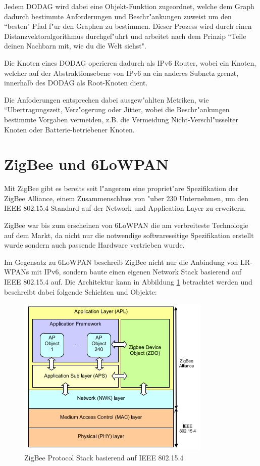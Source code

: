 \documentclass[final]{lktseminar}
\begin{document}
Jedem DODAG wird dabei eine Objekt-Funktion zugeordnet, welche dem Graph dadurch
bestimmte Anforderungen und Beschr"ankungen zuweist um den ``besten" Pfad f"ur den
Graphen zu bestimmen. Dieser Prozess wird durch einen Distanzvektoralgorithmus durchgef"uhrt
und arbeitet nach dem Prinzip ``Teile deinen Nachbarn mit, wie du die Welt siehst"\cite{rplwiki}.

Die Knoten eines DODAG operieren dadurch als IPv6 Router, wobei ein Knoten, welcher auf der
Abstraktionsebene von IPv6 an ein anderes Subnetz grenzt, innerhalb des DODAG als Root-Knoten
dient.

Die Anfoderungen entsprechen dabei ausgew"ahlten Metriken, wie ``Ubertragungszeit, Verz"ogerung oder Jitter,
wobei die Beschr"ankungen bestimmte Vorgaben vermeiden, z.B. die Vermeidung Nicht-Verschl"usselter Knoten oder
Batterie-betriebener Knoten.






\section{ZigBee und 6LoWPAN}
\label{sec: ZigBee und 6LoWPAN}

Mit ZigBee gibt es bereits seit l"angerem eine propriet"are Spezifikation der
ZigBee Alliance, einem Zusammenschluss von "uber 230 Unternehmen, um den IEEE 802.15.4
Standard auf der Network und Application Layer zu erweitern.

ZigBee war bis zum erscheinen von 6LoWPAN die am verbreiteste Technologie auf dem Markt,
da nicht nur die notwendige softwareseitige Spezifikation erstellt wurde sondern auch
passende Hardware vertrieben wurde.

Im Gegensatz zu 6LoWPAN beschreib ZigBee nicht nur die Anbindung von LR-WPANs mit IPv6,
 sondern baute einen eigenen Network Stack basierend auf IEEE 802.15.4 auf. Die
 Architektur kann in Abbildung \ref{fig:zigbee_protocol_stack} betrachtet werden und beschreibt
 dabei folgende Schichten und Objekte:

\begin{figure}[h]
    \centering
    \includegraphics{zigbee_stack.png}
    \caption{ZigBee Protocol Stack basierend auf IEEE 802.15.4 \cite{zigbee_stack_picture}}
    \label{fig:zigbee_protocol_stack}
\end{figure}
\end{document}
